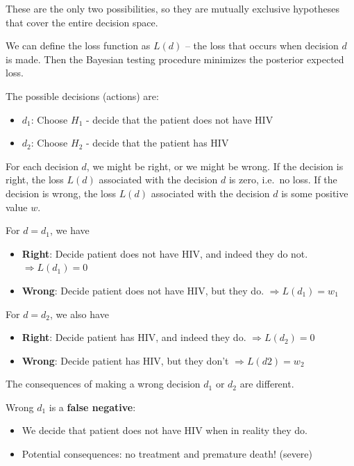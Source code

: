 \documentclass[]{book}
\providecommand{\tightlist}{%
  \setlength{\itemsep}{0pt}\setlength{\parskip}{0pt}}
\theoremstyle{definition}
\theoremstyle{definition}
\theoremstyle{definition}
\theoremstyle{remark}
\begin{document}
These are the only two possibilities, so they are mutually exclusive
hypotheses that cover the entire decision space.

We can define the loss function as \(L(d)\) -- the loss that occurs when
decision \(d\) is made. Then the Bayesian testing procedure minimizes
the posterior expected loss.

The possible decisions (actions) are:

\begin{itemize}
\tightlist
\item
  \(d_1\): Choose \(H_1\) - decide that the patient does not have HIV
\item
  \(d_2\): Choose \(H_2\) - decide that the patient has HIV
\end{itemize}

For each decision \(d\), we might be right, or we might be wrong. If the
decision is right, the loss \(L(d)\) associated with the decision \(d\)
is zero, i.e.~no loss. If the decision is wrong, the loss \(L(d)\)
associated with the decision \(d\) is some positive value \(w\).

For \(d=d_1\), we have

\begin{itemize}
\tightlist
\item
  \textbf{Right}: Decide patient does not have HIV, and indeed they do
  not. \(\Rightarrow L(d_1) = 0\)
\item
  \textbf{Wrong}: Decide patient does not have HIV, but they do.
  \(\Rightarrow L(d_1) = w_1\)
\end{itemize}

For \(d=d_2\), we also have

\begin{itemize}
\tightlist
\item
  \textbf{Right}: Decide patient has HIV, and indeed they do.
  \(\Rightarrow L(d_2) = 0\)
\item
  \textbf{Wrong}: Decide patient has HIV, but they don't
  \(\Rightarrow L(d2) = w_2\)
\end{itemize}

The consequences of making a wrong decision \(d_1\) or \(d_2\) are
different.

Wrong \(d_1\) is a \textbf{false negative}:

\begin{itemize}
\tightlist
\item
  We decide that patient does not have HIV when in reality they do.
\item
  Potential consequences: no treatment and premature death! (severe)
\end{itemize}
\end{document}

